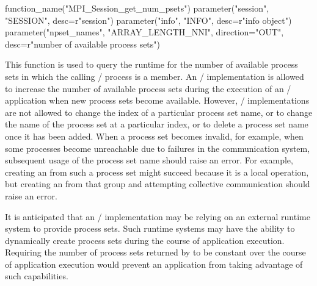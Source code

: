 \begin{mpi-binding}
    function_name("MPI_Session_get_num_psets")
    parameter("session", "SESSION", desc=r"session")
    parameter("info", "INFO", desc=r"info object")
    parameter("npset_names", "ARRAY_LENGTH_NNI", direction="OUT", desc=r"number of available process sets")
\end{mpi-binding}

This function is used to query the runtime for the number of available process sets in which the calling \MPI/ process is a member.
An \MPI/ implementation is allowed to increase the number of available process sets
during the execution of an \MPI/ application when new process sets become available.
However, \MPI/ implementations are not allowed
to change the index of a particular process set name,
or to change the name of the process set at a particular index,
or to delete a process set name once it has been added.
When a process set becomes invalid,
for example, when some processes become unreachable due to failures in the communication system,
subsequent usage of the process set name should raise an error.
For example, creating an  from such a process set might succeed because it is a local operation,
but creating an  from that group and attempting collective communication
should raise an error.

\begin{implementors}
It is anticipated that an \MPI/ implementation may be relying on an external runtime system to provide process sets.
Such runtime systems may have the ability to dynamically create process sets during the course of application execution.
Requiring the number of process sets returned by 
to be constant over the course of application execution would prevent an application from taking advantage of such capabilities.
\end{implementors}

